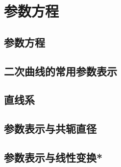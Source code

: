 \section{参数方程}
\label{sec:quadratic-parametric-equations}


\subsection{参数方程}
\label{subsec:quadratic-parametric-equations}


\subsection{二次曲线的常用参数表示}
\label{subsec:quadratic-conic-parametrizations}


\subsection{直线系}
\label{subsec:quadratic-line-families}


\subsection{参数表示与共轭直径}
\label{subsec:quadratic-conjugate-diameters}


\subsection{参数表示与线性变换*}
\label{subsec:quadratic-linear-transformation}

